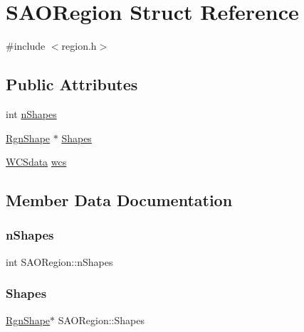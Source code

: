 \hypertarget{struct_s_a_o_region}{}\section{S\+A\+O\+Region Struct Reference}
\label{struct_s_a_o_region}


{\ttfamily \#include $<$region.\+h$>$}

\subsection*{Public Attributes}
\begin{DoxyCompactItemize}
\item 
int \hyperlink{struct_s_a_o_region_a665ba9d0397308b9b94897ab8502c81d}{n\+Shapes}
\item 
\hyperlink{struct_rgn_shape}{Rgn\+Shape} $\ast$ \hyperlink{struct_s_a_o_region_aa8338842b21a07f3370ac34712bb8288}{Shapes}
\item 
\hyperlink{struct_w_c_sdata}{W\+C\+Sdata} \hyperlink{struct_s_a_o_region_aaf9319ad8adb55abc895cac9ea743fad}{wcs}
\end{DoxyCompactItemize}


\subsection{Member Data Documentation}
\mbox{\label{struct_s_a_o_region_a665ba9d0397308b9b94897ab8502c81d}} 
\subsubsection{\texorpdfstring{n\+Shapes}{nShapes}}
{\footnotesize\ttfamily int S\+A\+O\+Region\+::n\+Shapes}

\mbox{\label{struct_s_a_o_region_aa8338842b21a07f3370ac34712bb8288}} 
\subsubsection{\texorpdfstring{Shapes}{Shapes}}
{\footnotesize\ttfamily \hyperlink{struct_rgn_shape}{Rgn\+Shape}$\ast$ S\+A\+O\+Region\+::\+Shapes}

